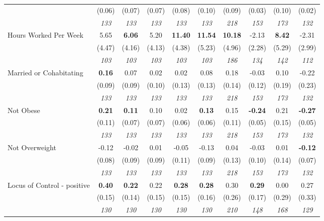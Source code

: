\begin{tabular}{l c c c c c c c c c}
& (0.06) & (0.07) & (0.07) & (0.08) & (0.10) & (0.09) & (0.03) & (0.10) & (0.02) \\
& \textit{ 133 } & \textit{ 133 } & \textit{ 133 } & \textit{ 133 } & \textit{ 133 } & \textit{ 218 } & \textit{ 153 } & \textit{ 173 } & \textit{ 132 } \\
Hours Worked Per Week & 5.65 & \textbf{ 6.06 } & 5.20 & \textbf{11.40} & \textbf{11.54} & \textbf{ 10.18 } & -2.13 & \textbf{ 8.42 } & -2.31 \\
& (4.47) & (4.16) & (4.13) & (4.38) & (5.23) & (4.96) & (2.28) & (5.29) & (2.99) \\
& \textit{ 103 } & \textit{ 103 } & \textit{ 103 } & \textit{ 103 } & \textit{ 103 } & \textit{ 186 } & \textit{ 134 } & \textit{ 142 } & \textit{ 112 } \\
Married or Cohabitating & \textbf{ 0.16 } & 0.07 & 0.02 & 0.02 & 0.08 & 0.18 & -0.03 & 0.10 & -0.22 \\
& (0.09) & (0.09) & (0.10) & (0.13) & (0.13) & (0.14) & (0.12) & (0.19) & (0.23) \\
& \textit{ 133 } & \textit{ 133 } & \textit{ 133 } & \textit{ 133 } & \textit{ 133 } & \textit{ 218 } & \textit{ 153 } & \textit{ 173 } & \textit{ 132 } \\
Not Obese & \textbf{ 0.21 } & \textbf{ 0.11 } & 0.10 & 0.02 & \textbf{0.13} & 0.15 & \textbf{-0.24} & 0.21 & \textbf{-0.27} \\
& (0.11) & (0.07) & (0.07) & (0.06) & (0.06) & (0.11) & (0.05) & (0.15) & (0.05) \\
& \textit{ 133 } & \textit{ 133 } & \textit{ 133 } & \textit{ 133 } & \textit{ 133 } & \textit{ 218 } & \textit{ 153 } & \textit{ 173 } & \textit{ 132 } \\
Not Overweight & -0.12 & -0.02 & 0.01 & -0.05 & -0.13 & 0.04 & -0.03 & 0.01 & \textbf{-0.12} \\
& (0.08) & (0.09) & (0.09) & (0.11) & (0.09) & (0.13) & (0.10) & (0.14) & (0.07) \\
& \textit{ 133 } & \textit{ 133 } & \textit{ 133 } & \textit{ 133 } & \textit{ 133 } & \textit{ 218 } & \textit{ 153 } & \textit{ 173 } & \textit{ 132 } \\
Locus of Control - positive & \textbf{ 0.40 } & \textbf{ 0.22 } & 0.22 & \textbf{0.28} & \textbf{0.28} & 0.30 & \textbf{0.29} & 0.00 & 0.27 \\
& (0.15) & (0.14) & (0.15) & (0.15) & (0.16) & (0.26) & (0.17) & (0.29) & (0.33) \\
& \textit{ 130 } & \textit{ 130 } & \textit{ 130 } & \textit{ 130 } & \textit{ 130 } & \textit{ 210 } & \textit{ 148 } & \textit{ 168 } & \textit{ 129 } \\

\end{tabular}
